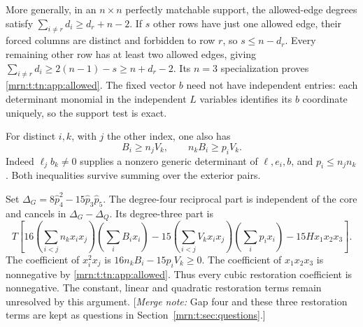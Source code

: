 \documentclass[11pt,a4paper]{article}
\theoremstyle{remark}\newtheorem{remark}[theorem]{Remark}
\newcommand{\mnote}[1]{[\textit{Merge note:} #1]}
\begin{document}
More generally, in an $n\times n$ perfectly matchable support, the
allowed-edge degrees satisfy
$\sum_{i\ne r}d_i\ge d_r+n-2$.
If $s$ other rows have just one allowed edge, their forced columns are
distinct and forbidden to row $r$, so $s\le n-d_r$.
Every remaining other row has at least two allowed edges, giving
$\sum_{i\ne r}d_i\ge2(n-1)-s\ge n+d_r-2$.
Its $n=3$ specialization proves \eqref{mrn:t:tn:app:allowed}.
The fixed vector $b$ need not have independent entries: each determinant
monomial in the independent $L$ variables identifies its $b$ coordinate
uniquely, so the support test is exact.

For distinct $i,k$, with $j$ the other index, one also has
\[
 B_i\ge n_jV_k,\qquad n_kB_i\ge p_iV_k.
\]
Indeed $\ell_jb_k\ne0$ supplies a nonzero generic determinant of
$\ell,e_i,b$, and $p_i\le n_jn_k$. Both inequalities survive summing
over the exterior pairs.

Set $\Delta_G=8\widehat p_4^2-15\widehat p_3\widehat p_5$.
The degree-four reciprocal part is independent of the core and cancels
in $\Delta_G-\Delta_Q$. Its degree-three part is
\[
 T\left[
 16\left(\sum_{i<j}n_kx_ix_j\right)\left(\sum_iB_ix_i\right)
 -15\left(\sum_{i<j}V_kx_ix_j\right)\left(\sum_ip_ix_i\right)
 -15Hx_1x_2x_3\right].
\]
The coefficient of $x_i^2x_j$ is
$16n_kB_i-15p_iV_k\ge0$.
The coefficient of $x_1x_2x_3$ is nonnegative by \eqref{mrn:t:tn:app:allowed}.
Thus every cubic restoration coefficient is nonnegative.
The constant, linear and quadratic restoration terms remain unresolved
by this argument.
\mnote{Gap four and these three restoration terms are kept as questions in
Section~\ref{mrn:t:sec:questions}.}

\end{document}
